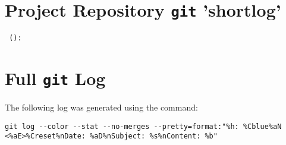 \section{Project Repository \texttt{git} 'shortlog'}
\lstset{numbers=none,frame=none}
\begin{lstlisting}
 ():

\end{lstlisting}

\clearpage
\section{Full \texttt{git} Log}
The following log was generated using the command:
\begin{lstlisting}
git log --color --stat --no-merges --pretty=format:"%h: %Cblue%aN <%aE>%Creset%nDate: %aD%nSubject: %s%nContent: %b"
\end{lstlisting}
\lstset{escapeinside=`'}
\begin{lstlisting}
\end{lstlisting}
